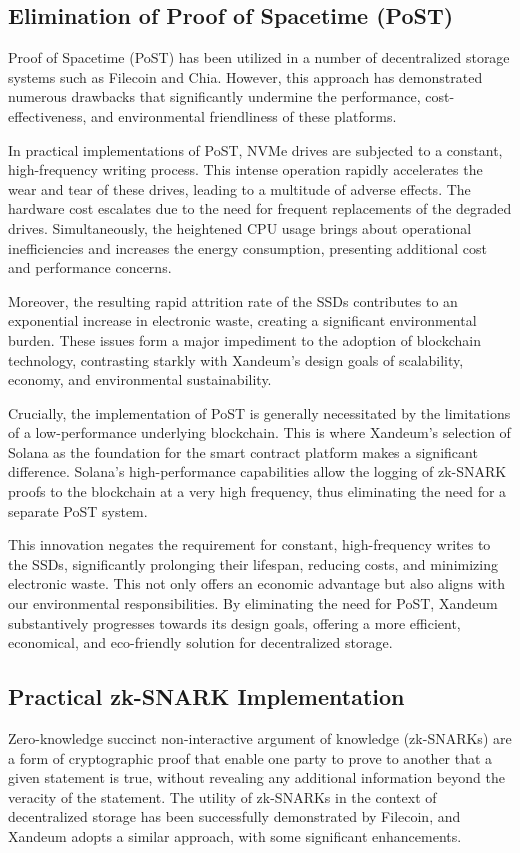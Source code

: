 \documentclass[11pt]{article}   	%
\begin{document}
\subsection{Elimination of Proof of Spacetime (PoST)}
Proof of Spacetime (PoST) has been utilized in a number of decentralized storage systems such as Filecoin and Chia. However, this approach has demonstrated numerous drawbacks that significantly undermine the performance, cost-effectiveness, and environmental friendliness of these platforms.

In practical implementations of PoST, NVMe drives are subjected to a constant, high-frequency writing process. This intense operation rapidly accelerates the wear and tear of these drives, leading to a multitude of adverse effects. The hardware cost escalates due to the need for frequent replacements of the degraded drives. Simultaneously, the heightened CPU usage brings about operational inefficiencies and increases the energy consumption, presenting additional cost and performance concerns.

Moreover, the resulting rapid attrition rate of the SSDs contributes to an exponential increase in electronic waste, creating a significant environmental burden. These issues form a major impediment to the adoption of blockchain technology, contrasting starkly with Xandeum's design goals of scalability, economy, and environmental sustainability.

Crucially, the implementation of PoST is generally necessitated by the limitations of a low-performance underlying blockchain. This is where Xandeum's selection of Solana as the foundation for the smart contract platform makes a significant difference. Solana's high-performance capabilities allow the logging of zk-SNARK proofs to the blockchain at a very high frequency, thus eliminating the need for a separate PoST system.

This innovation negates the requirement for constant, high-frequency writes to the SSDs, significantly prolonging their lifespan, reducing costs, and minimizing electronic waste. This not only offers an economic advantage but also aligns with our environmental responsibilities. By eliminating the need for PoST, Xandeum substantively progresses towards its design goals, offering a more efficient, economical, and eco-friendly solution for decentralized storage.

\subsection{Practical zk-SNARK Implementation}
Zero-knowledge succinct non-interactive argument of knowledge (zk-SNARKs) are a form of cryptographic proof that enable one party to prove to another that a given statement is true, without revealing any additional information beyond the veracity of the statement. The utility of zk-SNARKs in the context of decentralized storage has been successfully demonstrated by Filecoin, and Xandeum adopts a similar approach, with some significant enhancements.
\end{document}
